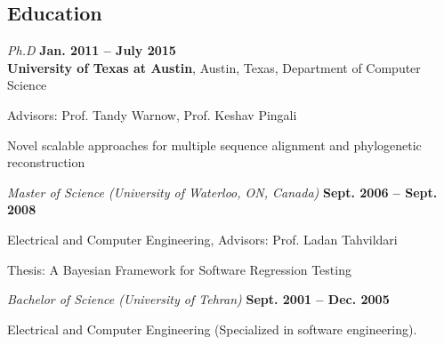 \documentclass[margin,line,letterpaper]{resume}
\begin{document}
\begin{resume}
    \section{\mysidestyle Education}
    \textsl{Ph.D}  \hfill \textbf{ Jan. 2011 -- July 2015}\\
    \textbf{University of Texas at Austin}, Austin, Texas, Department of Computer Science\vspace{-3mm}\\\vspace{-1mm}%
    \begin{list2}
        \item Advisors:  Prof. Tandy Warnow, Prof. Keshav Pingali
        \item Novel scalable approaches for multiple sequence
alignment and phylogenetic reconstruction
    \end{list2}\vspace{-1.5mm}
    
    \textsl{Master of Science ({University of Waterloo},  ON, Canada)} \hfill \textbf{ Sept. 2006 -- Sept. 2008}\\\vspace{-3mm}%
    \begin{list2}
        \item     Electrical and Computer Engineering,  Advisors:  Prof. Ladan Tahvildari
        \item Thesis: A Bayesian Framework for Software Regression Testing
    \end{list2}\vspace{-1.5mm}
    \textsl{Bachelor of Science (University of Tehran)} \hfill \textbf{ Sept. 2001 -- Dec. 2005}\vspace{-3mm}\\\vspace{-1mm}%
    \begin{list2}
        \item  Electrical and Computer Engineering (Specialized in software engineering).
    \end{list2}\vspace{-1.5mm}


\end{resume}
\end{document}
